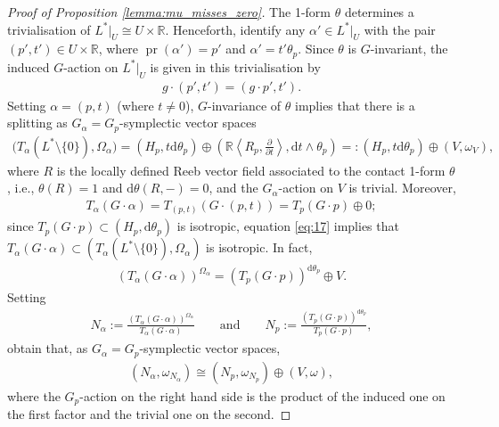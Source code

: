 \documentclass[pdftex]{sigma}
\numberwithin{equation}{section}
\newcommand{\de}{\mathrm{d}} %
\newcommand{\CM}{(M,H)} %
\newcommand{\SYM}{L^* \setminus \{0\}} %
\newcommand{\RR}{\mathbb{R}}
\begin{document}
\begin{proof}[Proof of Proposition \ref{lemma:mu_misses_zero}]
The 1-form $\theta$ determines a trivialisation of $L^*|_U \cong U \times \RR$. Henceforth, identify any $\alpha' \in L^*|_U$ with the pair $(p',t') \in U \times \RR$, where $\operatorname{pr} (\alpha' ) = p '$ and $\alpha' = t' \theta_p$. Since $\theta$ is $G$-invariant, the induced $G$-action on $L^*|_U$ is given in this trivialisation by
 \begin{gather*}
 g \cdot (p', t') = (g \cdot p', t').
 \end{gather*}
Setting $\alpha = (p,t)$ (where $t \neq 0$), $G$-invariance of $\theta$ implies that there is a splitting as $G_{\alpha} = G_p$-symplectic vector spaces
 \begin{gather*} %
 \big(T_{\alpha} ( \SYM ),\Omega_{\alpha}\big) = (H_p, t\de \theta_p ) \oplus \left(\RR \left\langle R_p,
 \frac{\partial}{\partial t} \right\rangle , \de t \wedge \theta_p\right)=: (H_p,t \de \theta_p) \oplus (V, \omega_V ),
 \end{gather*}
where $R$ is the locally def\/ined Reeb vector f\/ield associated to the contact 1-form $\theta$, i.e., $\theta(R) = 1$ and $\de \theta(R,-) = 0$, and the $G_{\alpha}$-action on $V$ is trivial. Moreover,
 \begin{gather} \label{eq:17}
 T_{\alpha} (G \cdot \alpha) = T_{(p,t)} (G \cdot (p,t) ) = T_p (G \cdot p ) \oplus 0;
 \end{gather}
since $T_{p} (G \cdot p) \subset (H_p, \de \theta_p)$ is isotropic, equation \eqref{eq:17} implies that $T_{\alpha} ( G \cdot \alpha ) \subset (T_{\alpha} ( \SYM ),\Omega_{\alpha})$ is isotropic. In fact,
 \begin{gather*}
(T_{\alpha} (G \cdot \alpha))^{\Omega_{\alpha}} = (T_{p} (G \cdot p ))^{\de \theta_p} \oplus V.
 \end{gather*}
Setting
 \begin{gather*}
 N_{\alpha}:= \frac{(T_{\alpha} (G \cdot \alpha))^{\Omega_{\alpha}}}{T_{\alpha} (G \cdot \alpha)}\qquad \text{and} \qquad N_p:= \frac{(T_{p} (G \cdot p))^{\de\theta_p}}{T_{p} (G \cdot p)},
 \end{gather*}
obtain that, as $G_{\alpha}=G_p$-symplectic vector spaces,
 \begin{gather} \label{eq:24}
(N_{\alpha}, \omega_{N_{\alpha}}) \cong (N_{p}, \omega_{N_{p}})\oplus (V,\omega),
 \end{gather}
where the $G_p$-action on the right hand side is the product of the induced one on the f\/irst factor and the trivial one on the second.


\end{proof}
\end{document}
